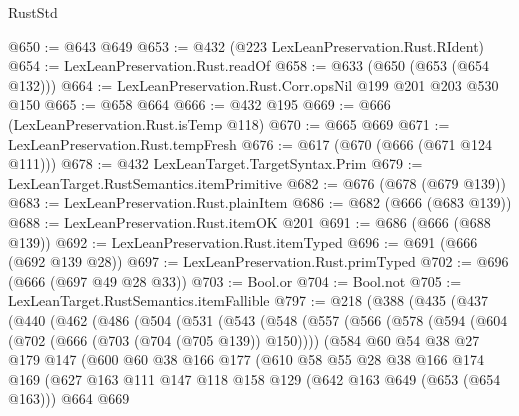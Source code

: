\begin{lexlean}{RustStd}
\begin{coremodule}
{\begin{coremodule}
{{{{{@650 := @643 @649
@653 := @432 (@223 LexLeanPreservation.Rust.RIdent)
@654 := LexLeanPreservation.Rust.readOf
@658 := @633 (@650 (@653 (@654 @132)))
@664 := LexLeanPreservation.Rust.Corr.opsNil @199 @201 @203 @530 @150
@665 := @658 @664
@666 := @432 @195
@669 := @666 (LexLeanPreservation.Rust.isTemp @118)
@670 := @665 @669
@671 := LexLeanPreservation.Rust.tempFresh
@676 := @617 (@670 (@666 (@671 @124 @111)))
@678 := @432 LexLeanTarget.TargetSyntax.Prim
@679 := LexLeanTarget.RustSemantics.itemPrimitive
@682 := @676 (@678 (@679 @139))
@683 := LexLeanPreservation.Rust.plainItem
@686 := @682 (@666 (@683 @139))
@688 := LexLeanPreservation.Rust.itemOK @201
@691 := @686 (@666 (@688 @139))
@692 := LexLeanPreservation.Rust.itemTyped
@696 := @691 (@666 (@692 @139 @28))
@697 := LexLeanPreservation.Rust.primTyped
@702 := @696 (@666 (@697 @49 @28 @33))
@703 := Bool.or
@704 := Bool.not
@705 := LexLeanTarget.RustSemantics.itemFallible
@797 := @218
    (@388
      (@435
        (@437
          (@440
            (@462
              (@486
                (@504
                  (@531
                    (@543
                      (@548
                        (@557
                          (@566
                            (@578
                              (@594
                                (@604 (@702 (@666 (@703 (@704 (@705 @139)) @150))))
                                (@584
                                  @60
                                  @54
                                  @38
                                  @27
                                  @179
                                  @147
                                  (@600
                                    @60
                                    @38
                                    @166
                                    @177
                                    (@610
                                      @58
                                      @55
                                      @28
                                      @38
                                      @166
                                      @174
                                      @169
                                      (@627
                                        @163
                                        @111
                                        @147
                                        @118
                                        @158
                                        @129
                                        (@642 @163 @649 (@653 (@654 @163)))
                                        @664
                                        @669
}}}}}
\end{coremodule}}
\end{coremodule}
\end{lexlean}
